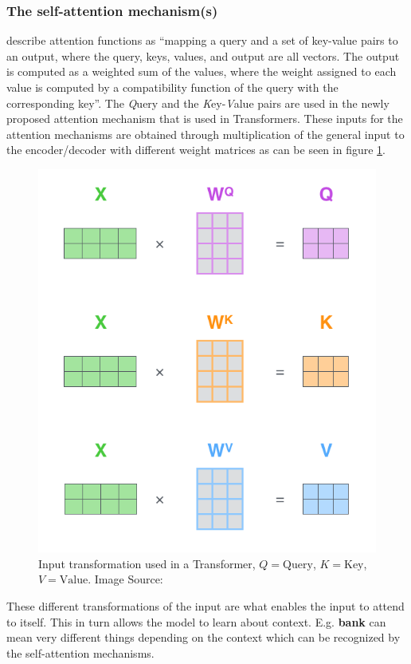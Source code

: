\documentclass[]{krantz}
\begin{document}
\hypertarget{the-self-attention-mechanisms}{%
\subsubsection{The self-attention mechanism(s)}\label{the-self-attention-mechanisms}}

\citet{vaswani2017attention} describe attention functions as ``mapping a query and a set of key-value pairs to an output,
where the query, keys, values, and output are all vectors. The output is computed as a weighted sum
of the values, where the weight assigned to each value is computed by a compatibility function of the
query with the corresponding key''.
The \emph{Q}uery and the \emph{K}ey-\emph{V}alue pairs are used in the
newly proposed attention mechanism that is used in Transformers.
These inputs for the attention mechanisms are obtained through multiplication of the
general input to the encoder/decoder with different weight matrices as can be seen in figure \ref{fig:self-attention-inputs}.

\begin{figure}

{\centering \includegraphics[width=0.5\linewidth]{figures/02-02-attention-and-self-attention-for-nlp/self-attention-matrix-calculation} 

}

\caption{Input transformation used in a Transformer, \(Q = \text{Query}\), \(K = \text{Key}\), \(V = \text{Value}\). Image Source: \citep{alammar2018transformer}}\label{fig:self-attention-inputs}
\end{figure}

These different transformations of the input are what enables the input to attend to itself.
This in turn allows the model to learn about context.
E.g. \textbf{bank} can mean very different things depending on the context which can be recognized by the self-attention mechanisms.
\end{document}
